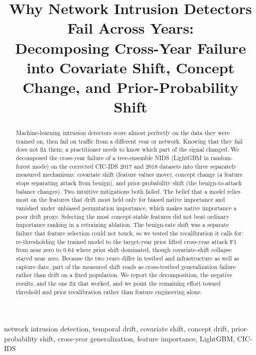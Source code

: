 \documentclass[conference]{IEEEtran}
\begin{document}
\title{Why Network Intrusion Detectors Fail Across Years:\\
Decomposing Cross-Year Failure into Covariate Shift, Concept Change,
and Prior-Probability Shift}

\author{
}

\maketitle
\begin{abstract}
Machine-learning intrusion detectors score almost perfectly on the data they were trained on, then fail on traffic from a different year or network. Knowing that they fail does not fix them; a practitioner needs to know which part of the signal changed. We decomposed the cross-year failure of a tree-ensemble NIDS (LightGBM in random-forest mode) on the corrected CIC-IDS 2017 and 2018 datasets into three separately measured mechanisms: covariate shift (feature values move), concept change (a feature stops separating attack from benign), and prior-probability shift (the benign-to-attack balance changes). Two intuitive mitigations both failed. The belief that a model relies most on the features that drift most held only for biased native importance and vanished under unbiased permutation importance, which makes native importance a poor drift proxy. Selecting the most concept-stable features did not beat ordinary importance ranking in a retraining ablation. The benign-rate shift was a separate failure that feature selection could not touch, so we tested the recalibration it calls for: re-thresholding the trained model to the target-year prior lifted cross-year attack F1 from near zero to 0.64 where prior shift dominated, though covariate-shift collapse stayed near zero. Because the two years differ in testbed and infrastructure as well as capture date, part of the measured shift reads as cross-testbed generalization failure rather than drift on a fixed population. We report the decomposition, the negative results, and the one fix that worked, and we point the remaining effort toward threshold and prior recalibration rather than feature engineering alone.
\end{abstract}

\begin{IEEEkeywords}
network intrusion detection, temporal drift, covariate shift, concept drift, prior-probability shift, cross-year generalization, feature importance, LightGBM, CIC-IDS
\end{IEEEkeywords}
\end{document}
